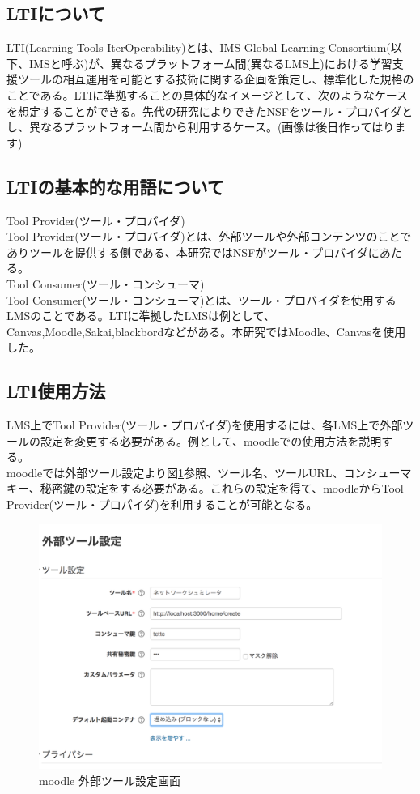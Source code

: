 \label{tag:LTI}
\subsection{LTIについて}
LTI(Learning Tools IterOperability)とは、IMS Global Learning Consortium(以下、IMSと呼ぶ)が、異なるプラットフォーム間(異なるLMS上)における学習支援ツールの相互運用を可能とする技術に関する企画を策定し、標準化した規格のことである。LTIに準拠することの具体的なイメージとして、次のようなケースを想定することができる。先代の研究によりできたNSFをツール・プロバイダとし、異なるプラットフォーム間から利用するケース。(画像は後日作ってはります)\\
\subsection{LTIの基本的な用語について}
Tool Provider(ツール・プロバイダ)\\
Tool Provider(ツール・プロバイダ)とは、外部ツールや外部コンテンツのことでありツールを提供する側である、本研究ではNSFがツール・プロバイダにあたる。\\
Tool Consumer(ツール・コンシューマ)\\
Tool Consumer(ツール・コンシューマ)とは、ツール・プロバイダを使用するLMSのことである。LTIに準拠したLMSは例として、Canvas,Moodle,Sakai,blackbordなどがある。本研究ではMoodle、Canvasを使用した。\\
\subsection{LTI使用方法}
LMS上でTool Provider(ツール・プロバイダ)を使用するには、各LMS上で外部ツールの設定を変更する必要がある。例として、moodleでの使用方法を説明する。\\
moodleでは外部ツール設定より図\ref{fig:moodle config}参照、ツール名、ツールURL、コンシューマキー、秘密鍵の設定をする必要がある。これらの設定を得て、moodleからTool Provider(ツール・プロパイダ)を利用することが可能となる。\\
\begin{figure}[htbp]
  \begin{center}
    \includegraphics[clip,width=12.0cm,height=8.0cm]{img/moodleSet.png}
    \caption{moodle 外部ツール設定画面}
    \label{fig:moodle config}
  \end{center}
\end{figure}

